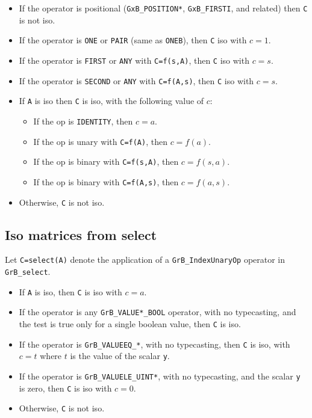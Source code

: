 \documentclass[12pt]{article}
\begin{document}
{    \begin{itemize}
    \item If the operator is positional (\verb'GxB_POSITION*',
    \verb'GxB_FIRSTI', and related) then \verb'C' is not iso.

    \item If the operator is \verb'ONE' or \verb'PAIR' (same as \verb'ONEB'),
        then \verb'C' iso with $c=1$.

    \item If the operator is \verb'FIRST' or \verb'ANY' with \verb'C=f(s,A)',
        then \verb'C' iso with $c=s$.

    \item If the operator is \verb'SECOND' or \verb'ANY' with \verb'C=f(A,s)',
        then \verb'C' iso with $c=s$.

    \item If \verb'A' is iso then \verb'C' is iso, with the following value
        of $c$:

        \begin{itemize}
        \item If the op is \verb'IDENTITY', then $c=a$.
        \item If the op is unary with \verb'C=f(A)', then $c=f(a)$.
        \item If the op is binary with \verb'C=f(s,A)', then $c=f(s,a)$.
        \item If the op is binary with \verb'C=f(A,s)', then $c=f(a,s)$.
        \end{itemize}


    \item Otherwise, \verb'C' is not iso.
    \end{itemize}

\subsection{Iso matrices from select}
\label{iso_select}

Let \verb'C=select(A)' denote the application of a \verb'GrB_IndexUnaryOp' operator
in \verb'GrB_select'.

    \begin{itemize}
    \item If \verb'A' is iso, then \verb'C' is iso with $c=a$.
    \item If the operator is any \verb'GrB_VALUE*_BOOL' operator,
        with no typecasting, and the test is true only for a single boolean
        value, then \verb'C' is iso.
    \item If the operator is \verb'GrB_VALUEEQ_*', with no typecasting,
        then \verb'C' is iso, with $c=t$ where $t$ is the value of the scalar
        \verb'y'.
    \item If the operator is \verb'GrB_VALUELE_UINT*', with no typecasting,
        and the scalar \verb'y' is zero, then \verb'C' is iso with $c=0$.
    \item Otherwise, \verb'C' is not iso.
    \end{itemize}

}
\end{document}
